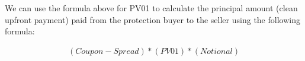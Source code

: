 \documentclass[article]{jss}
\begin{document}
We can use the formula above for PV01 to calculate the principal amount (clean upfront payment) paid from the protection buyer to the seller using the following formula:

\begin{equation}
 \begin{aligned}
   (Coupon - Spread)*(PV01)*(Notional)
    \end{aligned}
\end{equation}









\end{document}
